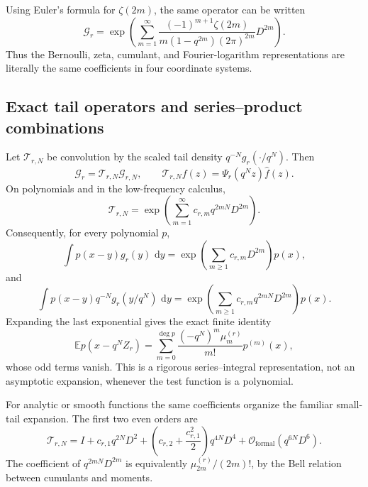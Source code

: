 \documentclass[11pt,oneside]{article}
\numberwithin{equation}{section}
\theoremstyle{definition}
\theoremstyle{remark}
\newcommand{\E}{\mathbb E}
\newcommand{\dd}{\,\mathrm d}
\newcommand{\bigO}{\mathcal O}
\newcommand{\cG}{\mathcal G}
\newcommand{\cT}{\mathcal T}
\begin{document}
Using Euler's formula for $\zeta(2m)$, the same operator can be written
\begin{equation}
 \cG_r
 =\exp\!\left(
   \sum_{m=1}^{\infty}
   \frac{(-1)^{m+1}\zeta(2m)}{m(1-q^{2m})(2\pi)^{2m}}
   D^{2m}\right).                                        \label{eq:Gr-zeta-operator}
\end{equation}
Thus the Bernoulli, zeta, cumulant, and Fourier-logarithm representations are
literally the same coefficients in four coordinate systems.

\subsection{Exact tail operators and series--product combinations}

Let $\cT_{r,N}$ be convolution by the scaled tail density
$q^{-N}g_r(\cdot/q^N)$.  Then
\begin{equation}
 \cG_r=\cT_{r,N}\cG_{r,N},
 \qquad
 \widehat{\cT_{r,N}f}(z)=\Psi_r(q^Nz)\widehat f(z).       \label{eq:tail-operator-factor}
\end{equation}
On polynomials and in the low-frequency calculus,
\begin{equation}
 \cT_{r,N}
 =\exp\!\left(\sum_{m=1}^{\infty}c_{r,m}q^{2mN}D^{2m}\right). \label{eq:tail-exponential}
\end{equation}
Consequently, for every polynomial $p$,
\begin{equation}
 \int p(x-y)g_r(y)\,\dd y
 =\exp\!\left(\sum_{m\ge1}c_{r,m}D^{2m}\right)p(x),       \label{eq:polynomial-exact-operator}
\end{equation}
and
\begin{equation}
 \int p(x-y)q^{-N}g_r(y/q^N)\,\dd y
 =\exp\!\left(\sum_{m\ge1}c_{r,m}q^{2mN}D^{2m}\right)p(x). \label{eq:tail-polynomial-operator}
\end{equation}
Expanding the last exponential gives the exact finite identity
\begin{equation}
 \E p(x-q^NZ_r)
 =\sum_{m=0}^{\deg p}\frac{(-q^N)^m\mu_m^{(r)}}{m!}p^{(m)}(x), \label{eq:tail-Taylor-polynomial}
\end{equation}
whose odd terms vanish.  This is a rigorous series--integral representation,
not an asymptotic expansion, whenever the test function is a polynomial.

For analytic or smooth functions the same coefficients organize the familiar
small-tail expansion.  The first two even orders are
\begin{equation}
 \cT_{r,N}
 =I+c_{r,1}q^{2N}D^2+
   \left(c_{r,2}+\frac{c_{r,1}^2}{2}\right)q^{4N}D^4
   +\bigO_{\mathrm{formal}}(q^{6N}D^6).                   \label{eq:tail-first-orders}
\end{equation}
The coefficient of $q^{2mN}D^{2m}$ is equivalently
$\mu_{2m}^{(r)}/(2m)!$, by the Bell relation between cumulants and moments.
\end{document}
